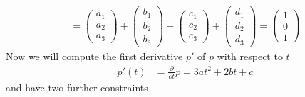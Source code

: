 \documentclass{article}
\begin{document}
\begin{align}
                = \left(\begin{matrix} a_1\\a_2\\a_3 \end{matrix}\right) + \left(\begin{matrix} b_1\\b_2\\b_3 \end{matrix}\right)
                + \left(\begin{matrix} c_1\\c_2\\c_3 \end{matrix}\right) + \left(\begin{matrix} d_1\\d_2\\d_3 \end{matrix}\right)
                = \left(\begin{matrix} 1\\0\\1 \end{matrix}\right)
        \end{align}
        Now we will compute the first derivative $p'$ of $p$ with respect to $t$
        \begin{align}
            p'(t) &= \frac{\partial}{\partial t} p = 3at^2 + 2bt + c
        \end{align}
        and have two further constraints
\end{document}
